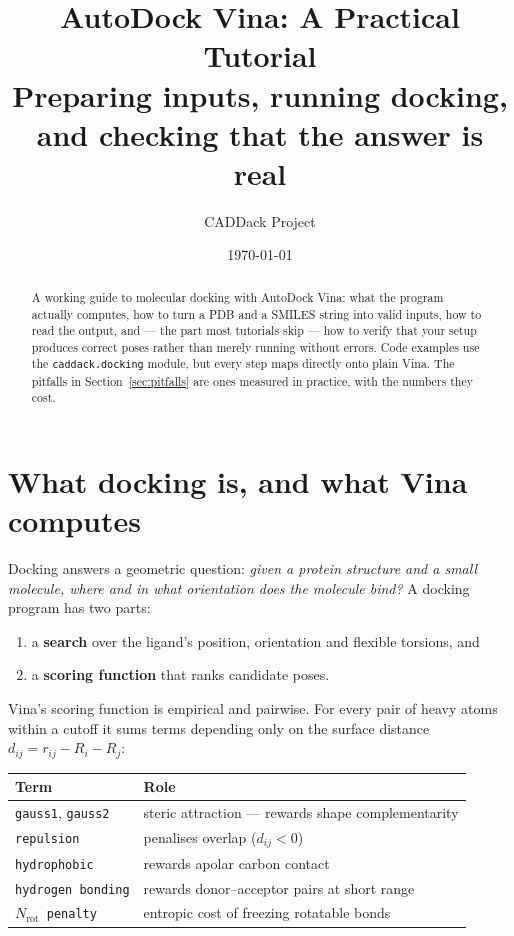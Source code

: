 \documentclass[11pt,a4paper]{article}
\title{\vspace{-1.5cm}\textbf{AutoDock Vina: A Practical Tutorial}\\[6pt]
  \large Preparing inputs, running docking, and checking that the answer is real}
\author{CADDack Project}
\date{\today}
\newcommand{\code}[1]{\texttt{#1}}
\begin{document}
\maketitle
\thispagestyle{fancy}

\begin{abstract}
\noindent
A working guide to molecular docking with AutoDock Vina: what the program actually
computes, how to turn a PDB and a SMILES string into valid inputs, how to read the
output, and --- the part most tutorials skip --- how to verify that your setup
produces correct poses rather than merely running without errors. Code examples use
the \code{caddack.docking} module, but every step maps directly onto plain Vina.
The pitfalls in Section~\ref{sec:pitfalls} are ones measured in practice, with the
numbers they cost.
\end{abstract}

\section{What docking is, and what Vina computes}

Docking answers a geometric question: \emph{given a protein structure and a small
molecule, where and in what orientation does the molecule bind?} A docking program
has two parts:

\begin{enumerate}[leftmargin=1.3em, itemsep=2pt]
  \item a \textbf{search} over the ligand's position, orientation and flexible
        torsions, and
  \item a \textbf{scoring function} that ranks candidate poses.
\end{enumerate}

Vina's scoring function is empirical and pairwise. For every pair of heavy atoms
within a cutoff it sums terms depending only on the surface distance
$d_{ij} = r_{ij} - R_i - R_j$:

\begin{center}
\renewcommand{\arraystretch}{1.25}
\begin{tabular}{@{}ll@{}}
\toprule
\textbf{Term} & \textbf{Role} \\
\midrule
\code{gauss1}, \code{gauss2} & steric attraction --- rewards shape complementarity \\
\code{repulsion} & penalises overlap ($d_{ij} < 0$) \\
\code{hydrophobic} & rewards apolar carbon contact \\
\code{hydrogen bonding} & rewards donor--acceptor pairs at short range \\
\code{$N_{\text{rot}}$ penalty} & entropic cost of freezing rotatable bonds \\
\bottomrule
\end{tabular}
\end{center}
\end{document}
